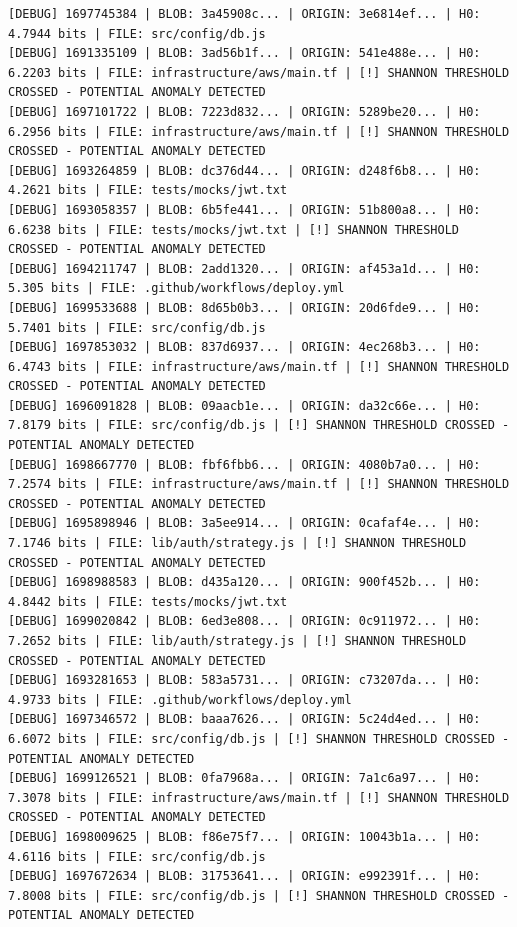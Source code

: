 \documentclass[12pt, a4paper, oneside]{report}
\begin{document}
\begin{lstlisting}[basicstyle=\tiny\ttfamily]
[DEBUG] 1697745384 | BLOB: 3a45908c... | ORIGIN: 3e6814ef... | H0: 4.7944 bits | FILE: src/config/db.js
[DEBUG] 1691335109 | BLOB: 3ad56b1f... | ORIGIN: 541e488e... | H0: 6.2203 bits | FILE: infrastructure/aws/main.tf | [!] SHANNON THRESHOLD CROSSED - POTENTIAL ANOMALY DETECTED
[DEBUG] 1697101722 | BLOB: 7223d832... | ORIGIN: 5289be20... | H0: 6.2956 bits | FILE: infrastructure/aws/main.tf | [!] SHANNON THRESHOLD CROSSED - POTENTIAL ANOMALY DETECTED
[DEBUG] 1693264859 | BLOB: dc376d44... | ORIGIN: d248f6b8... | H0: 4.2621 bits | FILE: tests/mocks/jwt.txt
[DEBUG] 1693058357 | BLOB: 6b5fe441... | ORIGIN: 51b800a8... | H0: 6.6238 bits | FILE: tests/mocks/jwt.txt | [!] SHANNON THRESHOLD CROSSED - POTENTIAL ANOMALY DETECTED
[DEBUG] 1694211747 | BLOB: 2add1320... | ORIGIN: af453a1d... | H0: 5.305 bits | FILE: .github/workflows/deploy.yml
[DEBUG] 1699533688 | BLOB: 8d65b0b3... | ORIGIN: 20d6fde9... | H0: 5.7401 bits | FILE: src/config/db.js
[DEBUG] 1697853032 | BLOB: 837d6937... | ORIGIN: 4ec268b3... | H0: 6.4743 bits | FILE: infrastructure/aws/main.tf | [!] SHANNON THRESHOLD CROSSED - POTENTIAL ANOMALY DETECTED
[DEBUG] 1696091828 | BLOB: 09aacb1e... | ORIGIN: da32c66e... | H0: 7.8179 bits | FILE: src/config/db.js | [!] SHANNON THRESHOLD CROSSED - POTENTIAL ANOMALY DETECTED
[DEBUG] 1698667770 | BLOB: fbf6fbb6... | ORIGIN: 4080b7a0... | H0: 7.2574 bits | FILE: infrastructure/aws/main.tf | [!] SHANNON THRESHOLD CROSSED - POTENTIAL ANOMALY DETECTED
[DEBUG] 1695898946 | BLOB: 3a5ee914... | ORIGIN: 0cafaf4e... | H0: 7.1746 bits | FILE: lib/auth/strategy.js | [!] SHANNON THRESHOLD CROSSED - POTENTIAL ANOMALY DETECTED
[DEBUG] 1698988583 | BLOB: d435a120... | ORIGIN: 900f452b... | H0: 4.8442 bits | FILE: tests/mocks/jwt.txt
[DEBUG] 1699020842 | BLOB: 6ed3e808... | ORIGIN: 0c911972... | H0: 7.2652 bits | FILE: lib/auth/strategy.js | [!] SHANNON THRESHOLD CROSSED - POTENTIAL ANOMALY DETECTED
[DEBUG] 1693281653 | BLOB: 583a5731... | ORIGIN: c73207da... | H0: 4.9733 bits | FILE: .github/workflows/deploy.yml
[DEBUG] 1697346572 | BLOB: baaa7626... | ORIGIN: 5c24d4ed... | H0: 6.6072 bits | FILE: src/config/db.js | [!] SHANNON THRESHOLD CROSSED - POTENTIAL ANOMALY DETECTED
[DEBUG] 1699126521 | BLOB: 0fa7968a... | ORIGIN: 7a1c6a97... | H0: 7.3078 bits | FILE: infrastructure/aws/main.tf | [!] SHANNON THRESHOLD CROSSED - POTENTIAL ANOMALY DETECTED
[DEBUG] 1698009625 | BLOB: f86e75f7... | ORIGIN: 10043b1a... | H0: 4.6116 bits | FILE: src/config/db.js
[DEBUG] 1697672634 | BLOB: 31753641... | ORIGIN: e992391f... | H0: 7.8008 bits | FILE: src/config/db.js | [!] SHANNON THRESHOLD CROSSED - POTENTIAL ANOMALY DETECTED

\end{lstlisting}
\end{document}
